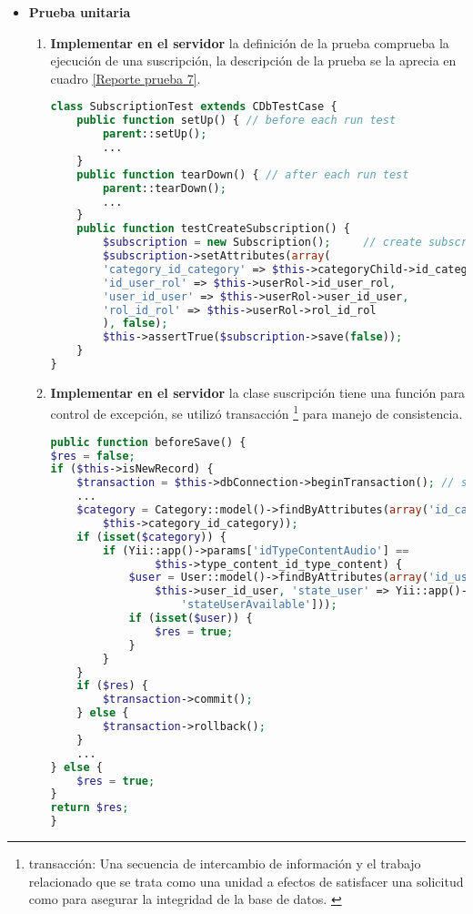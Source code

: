 \begin{itemize}

\item \textbf{Prueba unitaria}

\begin{enumerate}

\item \textbf{Implementar en el servidor} la definición de la prueba
 comprueba la ejecución de una
suscripción, la descripción de la prueba se la aprecia en 
cuadro \ref{Reporte prueba 7}.

\begin{lstlisting}[language=PHP, caption={Prueba de ejecución para suscripción.}]
class SubscriptionTest extends CDbTestCase {
    public function setUp() { // before each run test
        parent::setUp();
        ...
    }
    public function tearDown() { // after each run test
        parent::tearDown();
        ...
    }
    public function testCreateSubscription() {
        $subscription = new Subscription();     // create subscription
        $subscription->setAttributes(array(
        'category_id_category' => $this->categoryChild->id_category,
        'id_user_rol' => $this->userRol->id_user_rol,
        'user_id_user' => $this->userRol->user_id_user,
        'rol_id_rol' => $this->userRol->rol_id_rol
        ), false);
        $this->assertTrue($subscription->save(false));
    }
}
\end{lstlisting}

\item \textbf{Implementar en el servidor} la clase suscripción tiene una
función para control de excepción, se utilizó transacción \footnote{transacción:
Una secuencia de intercambio de información y el trabajo relacionado que se
trata como una unidad a efectos de satisfacer una solicitud como para
asegurar la integridad de la base de datos. \cite{transaction}} para manejo
de consistencia.

\begin{lstlisting}[language=PHP, caption={Función callback para control dependencia.}]
public function beforeSave() {
$res = false;
if ($this->isNewRecord) {
    $transaction = $this->dbConnection->beginTransaction(); // start transaction
    ...
    $category = Category::model()->findByAttributes(array('id_category' => 
        $this->category_id_category));
    if (isset($category)) {
        if (Yii::app()->params['idTypeContentAudio'] == 
                $this->type_content_id_type_content) {
            $user = User::model()->findByAttributes(array('id_user' => 
                $this->user_id_user, 'state_user' => Yii::app()->params[
                    'stateUserAvailable']));
            if (isset($user)) {
                $res = true;
            }
        }
    }
    if ($res) {
        $transaction->commit();
    } else {
        $transaction->rollback();
    }
    ...
} else {
    $res = true;
}
return $res;
}
\end{lstlisting}


\end{enumerate}
\end{itemize}
